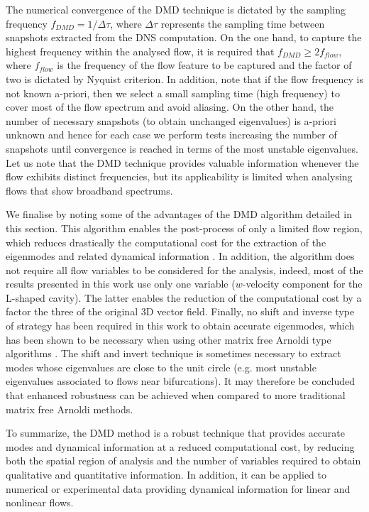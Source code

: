 \documentclass[a4paper,conference]{IEEEtran}
\begin{document}
The numerical convergence of the DMD technique is dictated by the sampling frequency $f_{DMD}=1/\Delta\tau$, where $\Delta\tau$ represents the sampling time between snapshots extracted from the DNS computation. On the one hand, to capture the highest frequency within the analysed flow, it is required that $f_{DMD}\geq2f_{flow}$, where $f_{flow}$ is the frequency of the flow feature to be captured and the factor of two is dictated by Nyquist criterion. In addition, note that if the flow frequency is not known a-priori, then we select a small sampling time (high frequency) to cover most of the flow spectrum and avoid aliasing. On the other hand, the number of necessary snapshots (to obtain unchanged eigenvalues) is a-priori unknown and hence for each case we perform tests increasing the number of snapshots until convergence is reached in terms of the most unstable eigenvalues.
Let us note that the DMD technique provides valuable information whenever the flow exhibits distinct frequencies, but its applicability is limited when analysing flows that show broadband spectrums.


We finalise by noting some of the advantages of the DMD algorithm detailed in this section.
This algorithm enables the post-process of only a limited flow region, which reduces drastically the computational cost for the extraction of the eigenmodes and related dynamical information \cite{DMDSchmid}. In addition, the algorithm does not require all flow variables to be considered for the analysis, indeed, most of the results presented in this work use only one variable ($w$-velocity component for the L-shaped cavity). The latter enables the reduction of the computational cost by a factor the three of the original 3D vector field. Finally, no shift and inverse type of strategy has been required in this work to obtain accurate eigenmodes, which has been shown to be necessary when using other matrix free Arnoldi type algorithms \cite{Vassilios_annual,Bagheri117430}. The shift and invert technique is sometimes necessary to extract modes whose eigenvalues are close to the unit circle (e.g. most unstable eigenvalues associated to flows near bifurcations).
It may therefore be concluded that enhanced robustness can be achieved when compared to more traditional matrix free Arnoldi methods.

To summarize, the DMD method is a robust technique that provides accurate modes and dynamical information at a reduced computational cost, by reducing both the spatial region of analysis and the number of variables required to obtain qualitative and quantitative information. In addition, it can be applied to numerical or experimental data providing dynamical information for linear and nonlinear flows.
\end{document}
